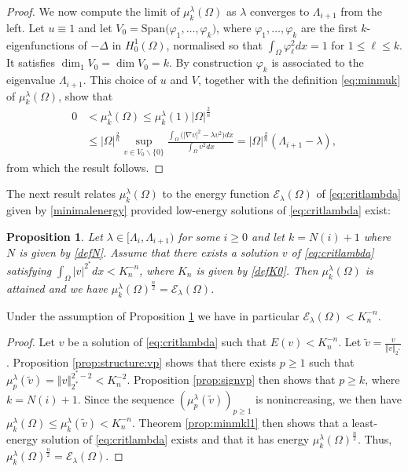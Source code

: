 \documentclass[10pt]{amsart}
\numberwithin{equation}{section}
\newcommand{\vp}{\varphi}
\newcommand{\Om}{\Omega}
\newcommand{\mkl}{\mu_{k}^{\lambda}}
\newcommand{\mpl}{\mu_{p}^{\lambda}}
\theoremstyle{plain}
\newtheorem{prop}{Proposition}[section]%
\theoremstyle{remark}
\begin{document}
\begin{proof}
We now compute the limit of $\mkl(\Om)$ as $\lambda$ converges to $\Lambda_{i+1}$ from the left. Let $u\equiv 1$ and let $V_0 = \text{Span}\big( \vp_1, \dots, \vp_{k} \big)$, where $ \vp_1, \dots, \vp_{k}$ are the first $k$-eigenfunctions of $- \Delta$ in $H^1_0(\Om)$, normalised so that $\int_{\Om} \vp_\ell^2 dx = 1$ for $1 \le \ell \le k$. It satisfies $\dim_1 V_0 = \dim V_0 = k$. By construction $\vp_{k}$ is associated to the eigenvalue $\Lambda_{i+1}$. This choice of $u$ and $V$, together with the definition \eqref{eq:minmuk} of $\mkl(\Om)$, show that 
\begin{equation} \label{test:function:C0}
\begin{aligned}
0 & < \mkl(\Om) \le \mkl(1)|\Om|^{\frac{2}{n}}  \\
& \le |\Om|^{\frac{2}{n}} \sup_{v \in V_0 \backslash \{0\}} \frac{\int_{\Om} \big( |\nabla v|^2 - \lambda v^2 \big) dx}{\int_{\Om} v^2 dx } = |\Om|^{\frac{2}{n}} (\Lambda_{i+1} - \lambda),
\end{aligned}
\end{equation}
from which the result follows. 
\end{proof}



The next result relates $\mkl(\Om)$ to the energy function $\mathcal{E}_{\lambda}(\Om)$ of \eqref{eq:critlambda} given by \eqref{minimalenergy}  provided low-energy solutions of \eqref{eq:critlambda} exist: 

\begin{prop} \label{prop:liens}
Let $\lambda \in [\Lambda_i, \Lambda_{i+1})$ for some $i \ge 0$ and let $k = N(i)+1$ where $N$ is given by \eqref{defN}. Assume that there exists a solution $v$ of \eqref{eq:critlambda} satisfying $\int_{\Om} |v|^{2^*} dx< K_n^{-n}$, where $K_n$ is given by \eqref{defK0}. Then $\mkl(\Om)$ is attained and we have $\mkl(\Om)^{\frac{n}{2}} = \mathcal{E}_{\lambda}(\Om)$. 
\end{prop}
Under the assumption of Proposition \ref{prop:liens} we have in particular $\mathcal{E}_\lambda(\Om) < K_n^{-n}$.

\begin{proof}
Let $v$ be a solution of \eqref{eq:critlambda} such that $E(v) < K_n^{-n}$. Let $\tilde v = \frac{v}{\Vert v \Vert_{2^*}}$. Proposition \ref{prop:structure:vp} shows that there exists $p \ge 1$ such that $\mpl(\tilde v) = \Vert v \Vert_{2^*}^{2^*-2} < K_n^{-2}$. Proposition \ref{prop:signvp} then shows that $p \ge k$, where $k = N(i)+1$. Since the sequence $(\mpl(\tilde v))_{p \ge1}$ is nonincreasing, we then have $\mkl(\Om) \le \mkl(\tilde v) < K_n^{-n}$. Theorem \ref{prop:minmkl1} then shows that a least-energy solution of \eqref{eq:critlambda} exists and that it has energy $\mkl(\Om)^{\frac{n}{2}}$. Thus, $\mkl(\Om)^{\frac{n}{2}} = \mathcal{E}_{\lambda}(\Om)$. 
\end{proof}
\end{document}
